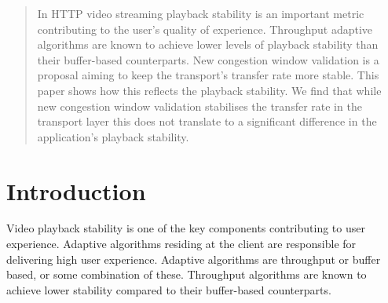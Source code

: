 \documentclass[10pt,sigconf]{acmart}
\newcommand{\maketitleSTD}{}
\newcommand{\maketitleACM}{\maketitle}
\newcommand{\maketitleSTD}{\maketitle}
\newcommand{\maketitleACM}{}
\begin{document}

\maketitleSTD
\begin{abstract}

In HTTP video streaming playback stability is an important metric contributing to the user's quality of experience. Throughput adaptive algorithms are known to achieve lower levels of playback stability than their buffer-based counterparts. New congestion window validation is a proposal aiming to keep the transport's transfer rate more stable. This paper shows how this reflects the playback stability. We find that while new congestion window validation stabilises the transfer rate in the transport layer this does not translate to a significant difference in the application's playback stability. 

\end{abstract}
\maketitleACM


\section{Introduction}
\label{sec:introduction}

%



Video playback stability is one of the key components contributing to user experience. Adaptive algorithms residing at the client are responsible for delivering high user experience. Adaptive algorithms are throughput or buffer based, or some combination of these. Throughput algorithms are known to achieve lower stability compared to their buffer-based counterparts.
\end{document}
